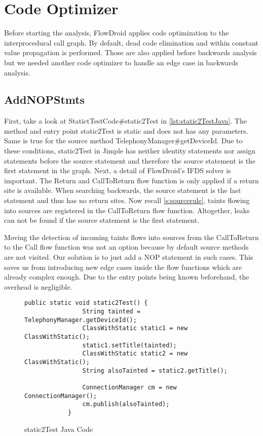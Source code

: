 \documentclass[../draft.tex]{subfiles}
\begin{document}
    \section{Code Optimizer}
    Before starting the analysis, FlowDroid applies code optimization to the interprocedural call graph. By default, dead code elimination and within constant value propagation is performed. Those are also applied before backwards analysis but we needed another code optimizer to handle an edge case in backwards analysis.

    \subsection{AddNOPStmts}
    First, take a look at StatictTestCode\#static2Test in \autoref{lst:static2TestJava}. The method and entry point static2Test is static and does not has any parameters. Same is true for the source method TelephonyManager\#getDeviceId. Due to these conditions, static2Test in Jimple has neither identity statements nor assign statements before the source statement and therefore the source statement is the first statement in the graph. 
    Next, a detail of FlowDroid's IFDS solver is important. The Return and CallToReturn flow function is only applied if a return site is available. When searching backwards, the source statement is the last statement and thus has no return sites. Now recall \autoref{s:sourcerule}, taints flowing into sources are registered in the CallToReturn flow function. Altogether, leaks can not be found if the source statement is the first statement.

    Moving the detection of incoming taints flows into sources from the CallToReturn to the Call flow function was not an option because by default source methods are not visited. 
    Our solution is to just add a NOP statement in such cases. This saves us from introducing new edge cases inside the flow functions which are already complex enough. Due to the entry points being known beforehand, the overhead is negligible.

    \begin{figure}
        \centering
        \begin{lstlisting}[gobble=12]
            public static void static2Test() {
                String tainted = TelephonyManager.getDeviceId();
                ClassWithStatic static1 = new ClassWithStatic();
                static1.setTitle(tainted);
                ClassWithStatic static2 = new ClassWithStatic();
                String alsoTainted = static2.getTitle();
                
                ConnectionManager cm = new ConnectionManager();
                cm.publish(alsoTainted);
            }
        \end{lstlisting}
        \caption{static2Test Java Code}
        \label{lst:static2TestJava}
    \end{figure}
\end{document}
